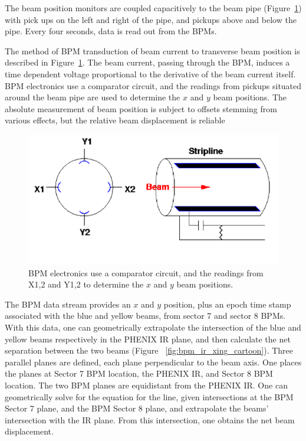 The beam position monitors are coupled capacitively to the beam
pipe (Figure~\ref{fig:bpm_schematic_cartoon}) with pick ups on the left and
right of the pipe, and pickups above and below the pipe. Every four seconds,
data is read out from the BPMs. 

The method of BPM transduction of beam current to transverse beam position is
described in Figure~\ref{fig:bpm_schematic_cartoon}. The beam current, passing
through the BPM,  induces a time dependent voltage proportional to the
derivative of the beam current itself. BPM electronics use a comparator circuit,
and the readings from pickups situated around the beam pipe are used to
determine the $x$ and $y$ beam positions. The absolute measurement of beam
position is subject to offsets stemming from various effects, but the relative
beam displacement is reliable~\cite{KawallFocus2004}

\begin{figure}[ht]
  \begin{center}
    \includegraphics[width=1.0\linewidth]{./figures/bpm_schematic}
    \caption{ 
      BPM electronics use a comparator circuit, and the readings from X{1,2} and
      Y{1,2} to determine the $x$ and $y$ beam positions. 
    }
    \label{fig:bpm_schematic_cartoon}
  \end{center}
\end{figure}

The BPM data stream provides an $x$ and $y$ position, plus an epoch time stamp
associated with the blue and yellow beams, from sector 7 and sector 8 BPMs.
With this data, one can geometrically extrapolate the intersection of the blue
and yellow beams respectively in the PHENIX IR plane, and then calculate the net
separation between the two beams (Figure ~\ref{fig:bpm_ir_xing_cartoon}).  Three
parallel planes are defined, each plane perpendicular to the beam axis.  One
places the planes at Sector 7 BPM location, the PHENIX IR, and Sector 8 BPM
location.  The two BPM planes are equidistant from the PHENIX IR. One can
geometrically solve for the equation for the line, given intersections at the
BPM Sector 7 plane, and the BPM Sector 8 plane, and extrapolate the beams'
intersection with the IR plane. From this intersection, one obtains the net beam
displacement.

